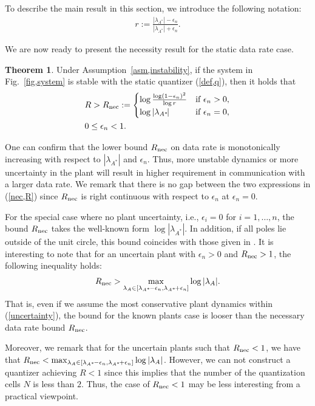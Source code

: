 \documentclass[a4paper, 11pt]{article}
\newcommand{\lambdaAS}{\lambda_{A^*}\!}
\newcommand{\lambdaA}{\lambda_{A}}
\newcommand{\Rnec}{R_{\textnormal{nec}}}
\theoremstyle{definition}
\newtheorem{thm}{Theorem}
\newcommand{\fref}[1]{Fig.~\ref{#1}}
\begin{document}
To describe the main result in this section, we introduce the following notation:
\begin{align}
r:=\frac{|\lambdaAS|-\epsilon_n}{|\lambdaAS|+\epsilon_n}.\label{def,nu,r}
\end{align}

We are now ready to present the necessity result for the static data rate case.
\begin{thm}\label{th,nec}
 Under Assumption~\ref{asm,instability}, if the system in \fref{fig,system}
is stable with the static quantizer (\ref{def,q}), then it holds that
\begin{align}
 &R>\Rnec:=
 \begin{cases}
  \log\frac{\log(1-\epsilon_n)^2}{\log r} &\text{if }\epsilon_n>0,\\
  \log|\lambdaAS|                         &\text{if }\epsilon_n=0,
 \end{cases}\label{nec,R}\\
&0\leq \epsilon_n<1\label{nec,e}.
\end{align}
\end{thm}

One can confirm that the lower bound $\Rnec$ on data rate is monotonically
increasing with respect to $|\lambdaAS|$ and $\epsilon_n$.
Thus, more unstable dynamics or more uncertainty in the plant will result
in higher requirement in communication with a larger data rate.
We remark that there is no gap between the two expressions in (\ref{nec,R})
since $\Rnec$ is right continuous with respect to $\epsilon_n$ at $\epsilon_n=0$.

For the special case where no plant uncertainty, i.e., $\epsilon_i=0$ for
$i=1,\dots,n$, the bound $\Rnec$ takes the well-known form $\log|\lambdaAS|$.
In addition, if all poles lie outside of the unit circle, this bound coincides
with those given in \cite{Tatikonda2004, Nair2004}.
It is interesting to note that for an uncertain plant with $\epsilon_n>0$
and $\Rnec>1$, the following inequality holds:
\begin{align}
 \Rnec>\max_{\lambdaA\in[\lambdaAS-\epsilon_n, \lambdaAS+\epsilon_n]}\log|\lambdaA|.\notag
\end{align}
That is, even if we assume the most conservative plant dynamics within
(\ref{uncertainty}), the bound for the known plants case is looser than the
necessary data rate bound $\Rnec$.

Moreover, we remark that for the uncertain plants such that $\Rnec<1$,
we have that $\Rnec<\max_{\lambdaA\in[\lambdaAS-\epsilon_n, \lambdaAS+\epsilon_n]}\log|\lambdaA|$.
However, we can not construct a quantizer achieving $R<1$ since this implies
that the number of the quantization cells $N$ is less than $2$.
Thus, the case of $\Rnec<1$ may be less interesting from a practical viewpoint.
\end{document}
